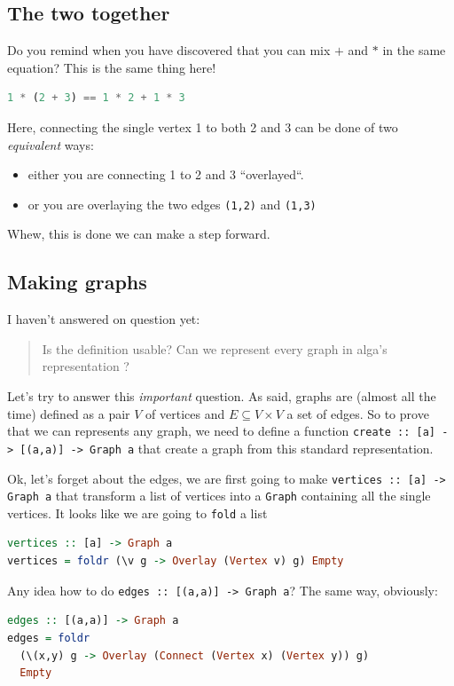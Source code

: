 \documentclass[10pt,a4paper]{article}
\begin{document}
\subsection{The two together}
Do you remind when you have discovered that you can mix $+$ and $*$ in the same equation? This is the same thing here!
\begin{lstlisting}[language=Haskell, frame=single]
1 * (2 + 3) == 1 * 2 + 1 * 3
\end{lstlisting}
Here, connecting the single vertex 1 to both 2 and 3 can be done of two \emph{equivalent} ways: 
\begin{itemize}
	\item either you are connecting 1 to 2 and 3 ``overlayed``.
	\item or you are overlaying the two edges \verb|(1,2)| and \verb|(1,3)|
\end{itemize}

Whew, this is done we can  make a step forward.

\subsection{Making graphs}
I haven't answered on question yet:
\begin{quote}
	Is the definition usable? Can we represent every graph in alga's representation ?
\end{quote}

Let's try to answer this \emph{important} question. As said, graphs are (almost all the time) defined as a pair $V$ of vertices and $E \subseteq V \times V$ a set of edges. So to prove that we can represents any graph, we need to define a function \verb|create :: [a] -> [(a,a)] -> Graph a| that create a graph from this standard representation.

Ok, let's forget about the edges, we are first going to make \verb|vertices :: [a] -> Graph a| that transform a list of vertices into a \verb|Graph| containing all the single vertices. It looks like we are going to \verb|fold| a list

\begin{lstlisting}[language=Haskell, frame=single]
vertices :: [a] -> Graph a
vertices = foldr (\v g -> Overlay (Vertex v) g) Empty
\end{lstlisting}

Any idea how to do \verb|edges :: [(a,a)] -> Graph a|? The same way, obviously:

\begin{lstlisting}[language=Haskell, frame=single]
edges :: [(a,a)] -> Graph a
edges = foldr 
  (\(x,y) g -> Overlay (Connect (Vertex x) (Vertex y)) g)
  Empty
\end{lstlisting}
\end{document}
